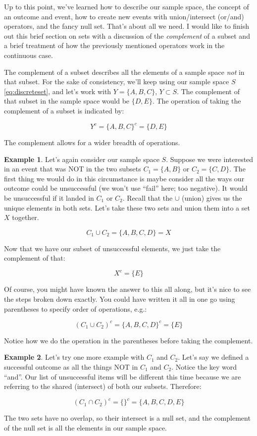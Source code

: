 \documentclass[
]{book}
\theoremstyle{definition}
\theoremstyle{definition}
\newtheorem{example}{Example}[chapter]
\theoremstyle{definition}
\theoremstyle{definition}
\theoremstyle{remark}
\begin{document}
Up to this point, we've learned how to describe our sample space, the concept of an outcome and event, how to create new events with union/intersect (or/and) operators, and the fancy null set. That's about all we need. I would like to finish out this brief section on sets with a discussion of the \emph{complement} of a subset and a brief treatment of how the previously mentioned operators work in the continuous case.

The complement of a subset describes all the elements of a sample space \emph{not} in that subset. For the sake of consistency, we'll keep using our sample space \(S\) \eqref{eq:discreteset}, and let's work with \(Y = \{A,B,C\}\), \(Y\subset S\). The complement of that subset in the sample space would be \(\{D, E\}\). The operation of taking the complement of a subset is indicated by:

\[ Y^c = \{A,B,C\}^c = \{D,E\} 
\label{eq:complement}\]

The complement allows for a wider breadth of operations.

\begin{example}
Let's again consider our sample space \(S\). Suppose we were interested in an event that was NOT in the two subsets \(C_1 = \{A,B\}\) or \(C_2 =\{C,D\}\). The first thing we would do in this circumstance is maybe consider all the ways our outcome could be unsuccessful (we won't use ``fail'' here; too negative). It would be unsuccessful if it landed in \(C_1\) or \(C_2\). Recall that the \(\cup\) (union) gives us the unique elements in both sets. Let's take these two sets and union them into a set \(X\) together.

\[ C_1 \cup C_2 = \{A,B,C,D\} = X \]

Now that we have our subset of unsuccessful elements, we just take the complement of that:

\[ X^c = \{E\} \]

Of course, you might have known the answer to this all along, but it's nice to see the steps broken down exactly. You could have written it all in one go using parentheses to specify order of operations, e.g.:

\[ (C_1 \cup C_2)^c = \{A, B, C, D\}^c = \{E\} \]

Notice how we do the operation in the parentheses before taking the complement.
\end{example}

\begin{example}
Let's try one more example with \(C_1\) and \(C_2\). Let's say we defined a successful outcome as all the things NOT in \(C_1\) and \(C_2\). Notice the key word ``and''. Our list of unsuccessful items will be different this time because we are referring to the shared (intersect) of both our subsets. Therefore:

\[ (C_1 \cap C_2)^c = \{\}^c = \{A,B,C,D,E\} \]

The two sets have no overlap, so their intersect is a null set, and the complement of the null set is all the elements in our sample space.
\end{example}
\end{document}
